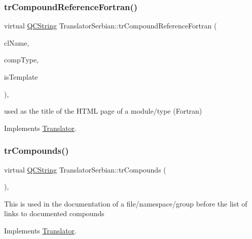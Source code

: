 \subsubsection{\texorpdfstring{trCompoundReferenceFortran()}{trCompoundReferenceFortran()}}
{\footnotesize\ttfamily virtual \mbox{\hyperlink{class_q_c_string}{Q\+C\+String}} Translator\+Serbian\+::tr\+Compound\+Reference\+Fortran (\begin{DoxyParamCaption}\item[{const char $\ast$}]{cl\+Name,  }\item[{\mbox{\hyperlink{class_class_def_ae70cf86d35fe954a94c566fbcfc87939}{Class\+Def\+::\+Compound\+Type}}}]{comp\+Type,  }\item[{bool}]{is\+Template }\end{DoxyParamCaption})\hspace{0.3cm}{\ttfamily [inline]}, {\ttfamily [virtual]}}

used as the title of the H\+T\+ML page of a module/type (Fortran) 

Implements \mbox{\hyperlink{class_translator}{Translator}}.

\mbox{\label{class_translator_serbian_a4df1c98ea3db8b76b56e8f83e6f73dae}} 
\subsubsection{\texorpdfstring{trCompounds()}{trCompounds()}}
{\footnotesize\ttfamily virtual \mbox{\hyperlink{class_q_c_string}{Q\+C\+String}} Translator\+Serbian\+::tr\+Compounds (\begin{DoxyParamCaption}{ }\end{DoxyParamCaption})\hspace{0.3cm}{\ttfamily [inline]}, {\ttfamily [virtual]}}

This is used in the documentation of a file/namespace/group before the list of links to documented compounds 

Implements \mbox{\hyperlink{class_translator}{Translator}}.

\mbox{\label{class_translator_serbian_a5d850e147da25448c84c5042832a0b85}} 
